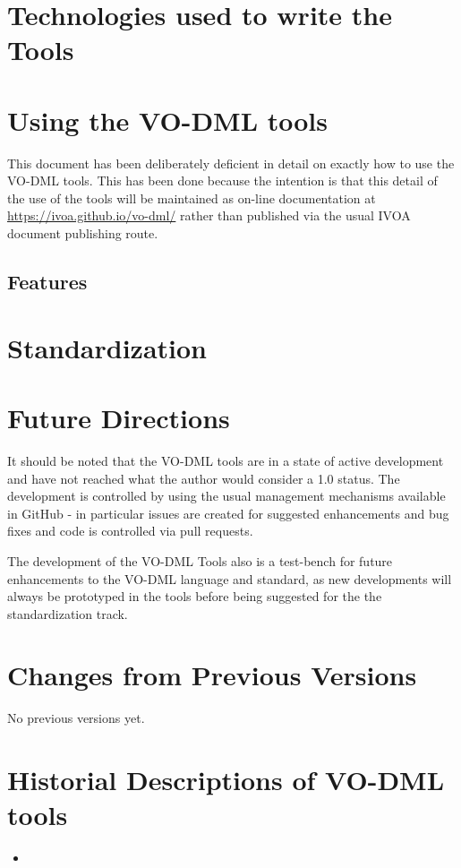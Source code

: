 \documentclass[11pt,a4paper]{ivoa}
\begin{document}
\section{Technologies used to write the Tools}

\section{Using the VO-DML tools}

This document has been deliberately deficient in detail on exactly how to use the VO-DML tools.
This has been done because the intention is that this detail of the use of the tools will be maintained
as on-line documentation at \url{https://ivoa.github.io/vo-dml/} rather than published via the usual IVOA document publishing route.

\subsection{Features}

\section{Standardization}

\section{Future Directions}

It should be noted that the VO-DML tools are in a state of active development and have not reached what the author would consider a 1.0 status.
The development is controlled by using the usual management mechanisms available in GitHub - in particular issues are created for suggested enhancements
and bug fixes and code is controlled via pull requests.

The development of the VO-DML Tools also is a test-bench for future enhancements to the VO-DML language and standard, as new developments will always
be prototyped in the tools before being suggested for the the standardization track.






\appendix
\section{Changes from Previous Versions}

No previous versions yet.

\section{Historial Descriptions of VO-DML tools}

\begin{itemize}
    \item
\end{itemize}


\end{document}

